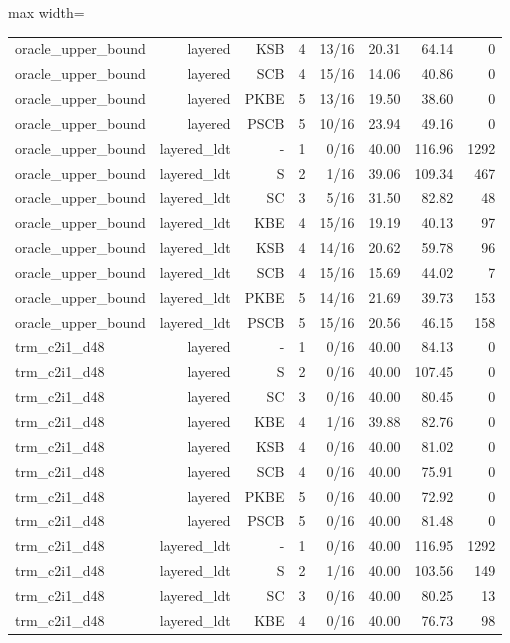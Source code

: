 \begin{table}[t]
\begin{adjustbox}{max width=\linewidth}
\begin{tabular}{lrrrrrrr}
oracle\_upper\_bound & layered & KSB & 4 & 13/16 & 20.31 & 64.14 & 0 \\
oracle\_upper\_bound & layered & SCB & 4 & 15/16 & 14.06 & 40.86 & 0 \\
oracle\_upper\_bound & layered & PKBE & 5 & 13/16 & 19.50 & 38.60 & 0 \\
oracle\_upper\_bound & layered & PSCB & 5 & 10/16 & 23.94 & 49.16 & 0 \\
oracle\_upper\_bound & layered\_ldt & - & 1 & 0/16 & 40.00 & 116.96 & 1292 \\
oracle\_upper\_bound & layered\_ldt & S & 2 & 1/16 & 39.06 & 109.34 & 467 \\
oracle\_upper\_bound & layered\_ldt & SC & 3 & 5/16 & 31.50 & 82.82 & 48 \\
oracle\_upper\_bound & layered\_ldt & KBE & 4 & 15/16 & 19.19 & 40.13 & 97 \\
oracle\_upper\_bound & layered\_ldt & KSB & 4 & 14/16 & 20.62 & 59.78 & 96 \\
oracle\_upper\_bound & layered\_ldt & SCB & 4 & 15/16 & 15.69 & 44.02 & 7 \\
oracle\_upper\_bound & layered\_ldt & PKBE & 5 & 14/16 & 21.69 & 39.73 & 153 \\
oracle\_upper\_bound & layered\_ldt & PSCB & 5 & 15/16 & 20.56 & 46.15 & 158 \\
trm\_c2i1\_d48 & layered & - & 1 & 0/16 & 40.00 & 84.13 & 0 \\
trm\_c2i1\_d48 & layered & S & 2 & 0/16 & 40.00 & 107.45 & 0 \\
trm\_c2i1\_d48 & layered & SC & 3 & 0/16 & 40.00 & 80.45 & 0 \\
trm\_c2i1\_d48 & layered & KBE & 4 & 1/16 & 39.88 & 82.76 & 0 \\
trm\_c2i1\_d48 & layered & KSB & 4 & 0/16 & 40.00 & 81.02 & 0 \\
trm\_c2i1\_d48 & layered & SCB & 4 & 0/16 & 40.00 & 75.91 & 0 \\
trm\_c2i1\_d48 & layered & PKBE & 5 & 0/16 & 40.00 & 72.92 & 0 \\
trm\_c2i1\_d48 & layered & PSCB & 5 & 0/16 & 40.00 & 81.48 & 0 \\
trm\_c2i1\_d48 & layered\_ldt & - & 1 & 0/16 & 40.00 & 116.95 & 1292 \\
trm\_c2i1\_d48 & layered\_ldt & S & 2 & 1/16 & 40.00 & 103.56 & 149 \\
trm\_c2i1\_d48 & layered\_ldt & SC & 3 & 0/16 & 40.00 & 80.25 & 13 \\
trm\_c2i1\_d48 & layered\_ldt & KBE & 4 & 0/16 & 40.00 & 76.73 & 98 \\

\end{tabular}
\end{adjustbox}
\end{table}

